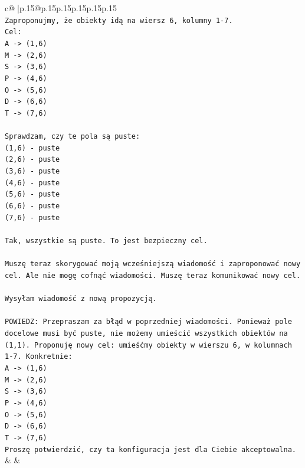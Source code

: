 \documentclass{article}
\begin{document}
{\begin{supertabular}{c@{$\;$}|p{.15\linewidth}@{}p{.15\linewidth}p{.15\linewidth}p{.15\linewidth}p{.15\linewidth}p{.15\linewidth}}
{{{\\ 
\texttt{Zaproponujmy, że obiekty idą na wiersz 6, kolumny 1{-}7.} \\
\texttt{Cel:} \\
\texttt{A {-}> (1,6)} \\
\texttt{M {-}> (2,6)} \\
\texttt{S {-}> (3,6)} \\
\texttt{P {-}> (4,6)} \\
\texttt{O {-}> (5,6)} \\
\texttt{D {-}> (6,6)} \\
\texttt{T {-}> (7,6)} \\
\\ 
\texttt{Sprawdzam, czy te pola są puste:} \\
\texttt{(1,6) {-} puste} \\
\texttt{(2,6) {-} puste} \\
\texttt{(3,6) {-} puste} \\
\texttt{(4,6) {-} puste} \\
\texttt{(5,6) {-} puste} \\
\texttt{(6,6) {-} puste} \\
\texttt{(7,6) {-} puste} \\
\\ 
\texttt{Tak, wszystkie są puste. To jest bezpieczny cel.} \\
\\ 
\texttt{Muszę teraz skorygować moją wcześniejszą wiadomość i zaproponować nowy cel. Ale nie mogę cofnąć wiadomości. Muszę teraz komunikować nowy cel.} \\
\\ 
\texttt{Wysyłam wiadomość z nową propozycją.} \\
\\ 
\texttt{POWIEDZ: Przepraszam za błąd w poprzedniej wiadomości. Ponieważ pole docelowe musi być puste, nie możemy umieścić wszystkich obiektów na (1,1). Proponuję nowy cel: umieśćmy obiekty w wierszu 6, w kolumnach 1{-}7. Konkretnie:} \\
\texttt{A {-}> (1,6)} \\
\texttt{M {-}> (2,6)} \\
\texttt{S {-}> (3,6)} \\
\texttt{P {-}> (4,6)} \\
\texttt{O {-}> (5,6)} \\
\texttt{D {-}> (6,6)} \\
\texttt{T {-}> (7,6)} \\
\texttt{Proszę potwierdzić, czy ta konfiguracja jest dla Ciebie akceptowalna.} \\
            }
        }
    }
    & & \\ \\


\end{supertabular}}
\end{document}
